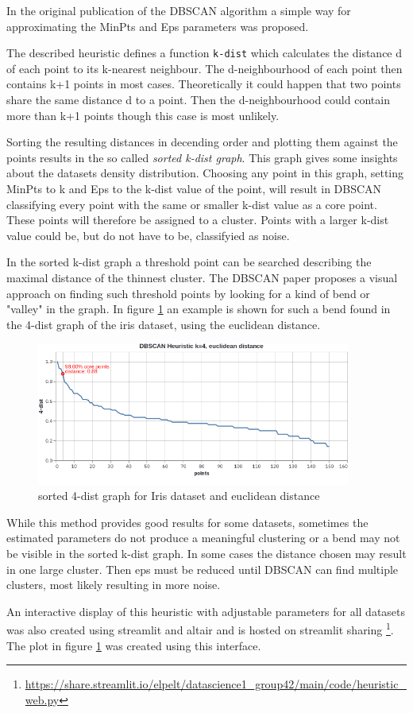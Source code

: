 In the original publication of the DBSCAN algorithm \cite{dbscan} a simple way for approximating the MinPts and Eps parameters was proposed.

The described heuristic defines a function \texttt{k-dist} which calculates the distance d of each point to its k-nearest neighbour.
The d-neighbourhood of each point then contains k+1 points in most cases. Theoretically it could happen that two points share the same distance d to a point. Then the d-neighbourhood could contain more than k+1 points though this case is most unlikely.

Sorting the resulting distances in decending order and plotting them against the points results in the so called \textit{sorted k-dist graph}. This graph gives some insights about the datasets density distribution. Choosing any point in this graph, setting MinPts to k and Eps to the k-dist value of the point, will result in DBSCAN classifying every point with the same or smaller k-dist value as a core point. These points will therefore be assigned to a cluster. Points with a larger k-dist value could be, but do not have to be, classifyied as noise. 

In the sorted k-dist graph a threshold point can be searched describing the maximal distance of the thinnest cluster. The DBSCAN paper \cite{dbscan} proposes a visual approach on finding such threshold points by looking for a kind of bend or "valley" in the graph. 
In figure \ref{fig:sorteddistgraphiriseucl} an example is shown for such a bend found in the 4-dist graph of the iris dataset, using the euclidean distance.

\begin{figure}[H]
    \includegraphics[width=0.92\textwidth]{../plots/dbscan/iris_4dist_euclidean}
    \caption{sorted 4-dist graph for Iris dataset and euclidean distance}
    \label{fig:sorteddistgraphiriseucl}
\end{figure}

While this method provides good results for some datasets, sometimes the estimated parameters do not produce a meaningful clustering or a bend may not be visible in the sorted k-dist graph. In some cases the distance chosen may result in one large cluster. Then eps must be reduced until DBSCAN can find multiple clusters, most likely resulting in more noise.

An interactive display of this heuristic with adjustable parameters for all datasets was also created using streamlit and altair and is hosted on streamlit sharing 
\footnote{\scriptsize\url{https://share.streamlit.io/elpelt/datascience1_group42/main/code/heuristic_web.py}}.
The plot in figure \ref{fig:sorteddistgraphiriseucl} was created using this interface.
